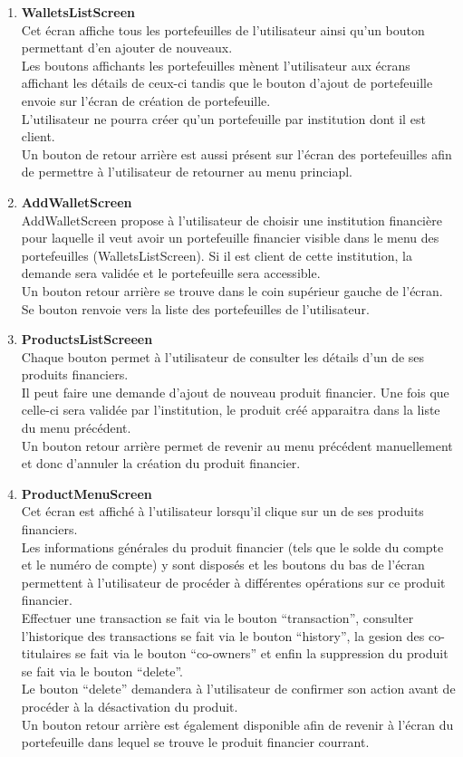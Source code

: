 \documentclass{article}
\begin{document}
\begin{enumerate}
\item \textbf{WalletsListScreen} \\
Cet écran affiche tous les portefeuilles de l'utilisateur ainsi qu'un bouton permettant d'en ajouter de nouveaux.\\
Les boutons affichants les portefeuilles mènent l'utilisateur aux écrans affichant les détails de ceux-ci tandis que le bouton d'ajout de portefeuille envoie sur l'écran de création de portefeuille.\\
L'utilisateur ne pourra créer qu'un portefeuille par institution dont il est client.\\
Un bouton de retour arrière est aussi présent sur l'écran des portefeuilles afin de permettre à l'utilisateur de retourner au menu princiapl.

\item \textbf{AddWalletScreen} \\
AddWalletScreen propose à l'utilisateur de choisir une institution financière pour laquelle il veut avoir un portefeuille financier visible dans le menu des portefeuilles (WalletsListScreen). Si il est client de cette institution, la demande sera validée et le portefeuille sera accessible.\\
Un bouton retour arrière se trouve dans le coin supérieur gauche de l'écran. Se bouton renvoie vers la liste des portefeuilles de l'utilisateur.

\item \textbf{ProductsListScreeen} \\
Chaque bouton permet à l'utilisateur de consulter les détails d'un de ses produits financiers.\\
Il peut faire une demande d'ajout de nouveau produit financier. Une fois que celle-ci sera validée par l'institution, le produit créé apparaitra dans la liste du menu précédent.\\
Un bouton retour arrière permet de revenir au menu précédent manuellement et donc d'annuler la création du produit financier.

\item \textbf{ProductMenuScreen}\\
Cet écran est affiché à l'utilisateur lorsqu'il clique sur un de ses produits financiers. \\
Les informations générales du produit financier (tels que le solde du compte et le numéro de compte) y sont disposés et les boutons du bas de l'écran permettent à l'utilisateur de procéder à différentes opérations sur ce produit financier.\\
Effectuer une transaction se fait via le bouton ``transaction'', consulter l'historique des transactions se fait via le bouton ``history'',
la gesion des co-titulaires se fait via le bouton ``co-owners'' et enfin la suppression du produit se fait via le bouton ``delete''.\\
Le bouton ``delete'' demandera à l'utilisateur de confirmer son action avant de procéder à la désactivation du produit.\\
Un bouton retour arrière est également disponible afin de revenir à l'écran du portefeuille dans lequel se trouve le produit financier courrant.


\end{enumerate}
\end{document}
